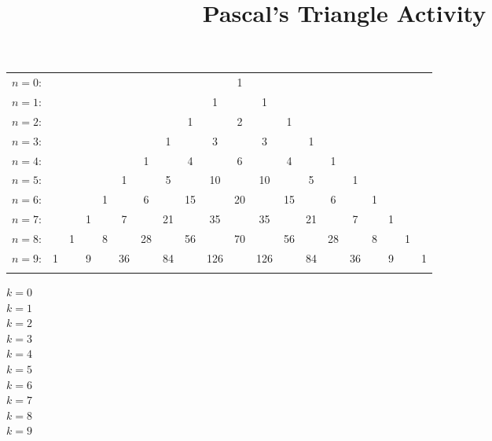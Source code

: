 \documentclass[11pt]{amsart}
\title{Pascal's Triangle Activity}
\begin{document}
\maketitle

\begin{tabular}{rccccccccccccccccccc}
$n=0$:&&&&&&    &    &    &    &  1\\\noalign{\smallskip\smallskip}
$n=1$:&&&&&&   &    &    &  1 &    &  1\\\noalign{\smallskip\smallskip}
$n=2$:&&&&&&    &    &  1 &    &  2 &    &  1\\\noalign{\smallskip\smallskip}
$n=3$:&&&&&&    &  1 &    &  3 &    &  3 &    &  1\\\noalign{\smallskip\smallskip}
$n=4$:&&&&& & 1 &    &  4 &    &  6 &    &  4 &    &  1\\\noalign{\smallskip\smallskip}
$n=5$:&&&&&1&  &5 &    &  10 &    &  10 &    &  5 &    &  1\\\noalign{\smallskip\smallskip}
$n=6$:&&&&1&  &6 &    &  15 &    &  20 &    &  15 &    &  6 &&1\\\noalign{\smallskip\smallskip}
$n=7$:&&&1&  &7 &    &  21 &    &  35 &    &  35 &    &  21&&7&&1\\\noalign{\smallskip\smallskip}
$n=8$:&&1&  &8&    &  28 &    &  56 &    & 70 &    &  56&&28&&8&&1\\\noalign{\smallskip\smallskip}
$n=9$:&1&  &9&    &  36 &    &  84 &    & 126 &    &  126&&84&&36&&9&&1\\\noalign{\smallskip\smallskip}
\end{tabular}

$k=0$\\
$k=1$\\
$k=2$\\
$k=3$\\
$k=4$\\
$k=5$\\
$k=6$\\
$k=7$\\
$k=8$\\
$k=9$\\
\end{document}
